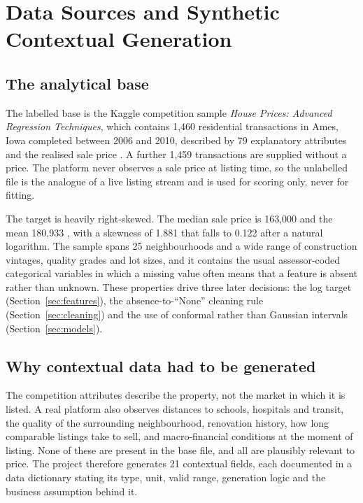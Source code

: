 \section{Data Sources and Synthetic Contextual Generation}
\label{sec:data}

\subsection{The analytical base}

The labelled base is the Kaggle competition sample \emph{House Prices: Advanced
Regression Techniques}, which contains 1,460 residential transactions in Ames, Iowa
completed between 2006 and 2010, described by 79 explanatory attributes and the
realised sale price \citep{kaggle2016,decock2011}. A further 1,459 transactions are
supplied without a price. The platform never observes a sale price at listing time,
so the unlabelled file is the analogue of a live listing stream and is used for
scoring only, never for fitting.

The target is heavily right-skewed. The median sale price is 163,000 \USD{} and the
mean 180,933 \USD, with a skewness of 1.881 that falls to 0.122 after a natural
logarithm. The sample spans 25 neighbourhoods and a wide range of construction
vintages, quality grades and lot sizes, and it contains the usual assessor-coded
categorical variables in which a missing value often means that a feature is absent
rather than unknown. These properties drive three later decisions: the log target
(Section~\ref{sec:features}), the absence-to-``None'' cleaning rule
(Section~\ref{sec:cleaning}) and the use of conformal rather than Gaussian intervals
(Section~\ref{sec:models}).

\subsection{Why contextual data had to be generated}

The competition attributes describe the property, not the market in which it is
listed. A real platform also observes distances to schools, hospitals and transit,
the quality of the surrounding neighbourhood, renovation history, how long comparable
listings take to sell, and macro-financial conditions at the moment of listing. None
of these are present in the base file, and all are plausibly relevant to price. The
project therefore generates 21 contextual fields, each documented in a data
dictionary stating its type, unit, valid range, generation logic and the business
assumption behind it.

